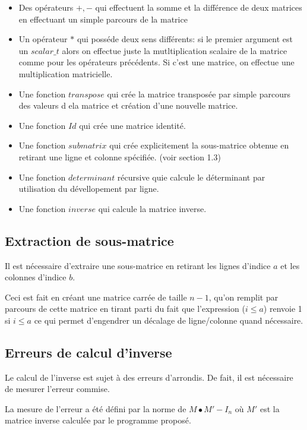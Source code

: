 \documentclass[a4paper,11pt]{article}
\begin{document}
\begin{itemize}
\item Des opérateurs $+,-$ qui effectuent la somme et la différence de deux matrices en effectuant un simple parcours de la matrice
\item Un opérateur $*$ qui posséde deux sens différents: si le premier argument est un $scalar\_t$ alors on effectue juste la mutltiplication scalaire de la matrice comme pour les opérateurs précédents. Si c'est une matrice, on effectue une multiplication matricielle.
\item Une fonction $transpose$ qui crée la matrice transposée par simple parcours des valeurs d ela matrice et création d'une nouvelle matrice.
\item Une fonction $Id$ qui crée une matrice identité.
\item Une fonction $submatrix$ qui crée explicitement la sous-matrice obtenue en retirant une ligne et colonne spécifiée. (voir section 1.3)
\item Une fonction $determinant$ récursive quie calcule le déterminant par utilisation du dévellopement par ligne.
\item Une fonction $inverse$ qui calcule la matrice inverse.
\end{itemize}

\subsection{Extraction de sous-matrice}

Il est nécessaire d'extraire une sous-matrice en retirant les lignes d'indice $a$ et les colonnes d'indice $b$. 

Ceci est fait en créant une matrice carrée de taille $n-1$, qu'on remplit par parcours de cette matrice en tirant parti du fait que l'expression
($i \leq a$) renvoie 1 si $i \leq a$ ce qui permet d'engendrer un décalage de ligne/colonne quand nécessaire.

\subsection{Erreurs de calcul d'inverse}

Le calcul de l'inverse est sujet à des erreurs d'arrondis. De fait, il est nécessaire de mesurer l'erreur commise.

La mesure de l'erreur a été défini par la norme de $M\bullet M' - I_n$ où $M'$ est la matrice inverse calculée par le programme proposé.
\end{document}
